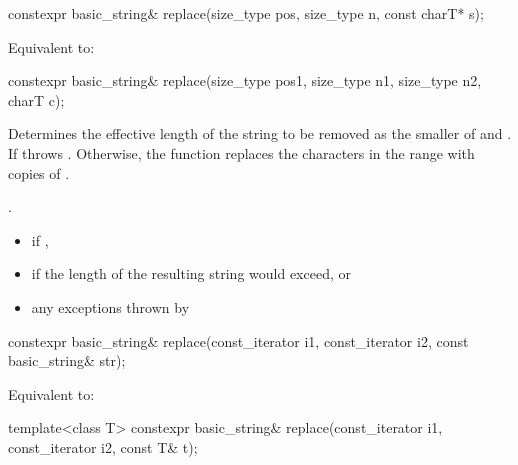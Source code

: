 %
\begin{itemdecl}
constexpr basic_string& replace(size_type pos, size_type n, const charT* s);
\end{itemdecl}

\begin{itemdescr}
\pnum
\effects
Equivalent to: 
\end{itemdescr}

%
\begin{itemdecl}
constexpr basic_string& replace(size_type pos1, size_type n1, size_type n2, charT c);
\end{itemdecl}

\begin{itemdescr}
\pnum
\effects
Determines the effective length  of the string to be
removed as the smaller of  and . If
  throws . Otherwise,
the function replaces the characters in the range
with  copies of .

\pnum
\returns
{}.

\pnum
\throws
\begin{itemize}
\item {} if ,
\item {} if the length of the resulting string
would exceed, or
\item any exceptions thrown by 
\end{itemize}
\end{itemdescr}

%
\begin{itemdecl}
constexpr basic_string& replace(const_iterator i1, const_iterator i2, const basic_string& str);
\end{itemdecl}

\begin{itemdescr}
\pnum
\effects
Equivalent to: 
\end{itemdescr}

%
\begin{itemdecl}
template<class T>
  constexpr basic_string& replace(const_iterator i1, const_iterator i2, const T& t);
\end{itemdecl}

